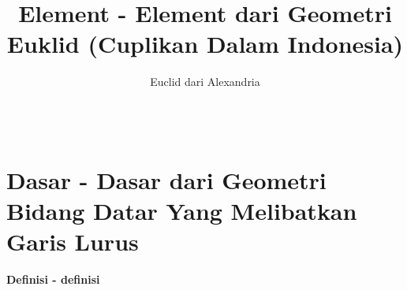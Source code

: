 \documentclass[a4paper, 12pt]{book}
\begin{document}
\title{\textbf{Element - Element dari Geometri Euklid 
(Cuplikan Dalam Indonesia)}}
\author{Euclid dari Alexandria}
\maketitle
{}
\pagestyle{empty}
\setcounter{chapter}{1}
\chapter*{\centering \chaptername{ \thechapter} \\Dasar - Dasar dari Geometri Bidang Datar Yang Melibatkan Garis Lurus}


\begin{center}
\textbf{Definisi - definisi}
\end{center}
\end{document}
